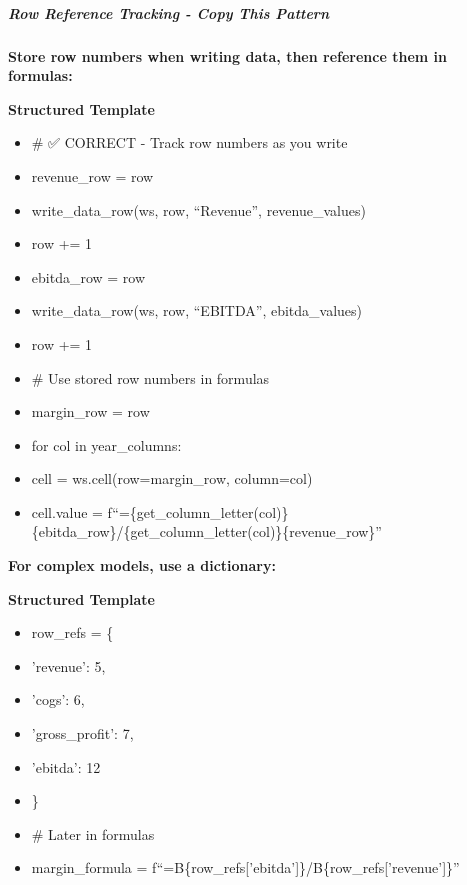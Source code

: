 \documentclass[11pt]{article}
\begin{document}
\subparagraph{Row Reference Tracking - Copy This Pattern}\mbox{}\par

\textbf{Store row numbers when writing data, then reference them in formulas:}


\textbf{Structured Template}
\begin{itemize}[leftmargin=*,itemsep=2pt,topsep=2pt]
\item {} \# ✅ CORRECT - Track row numbers as you write
\item {} revenue\_\allowbreak{}row = row
\item {} write\_\allowbreak{}data\_\allowbreak{}row(ws, row, ``Revenue'', revenue\_\allowbreak{}values)
\item {} row += 1
\item {} ebitda\_\allowbreak{}row = row
\item {} write\_\allowbreak{}data\_\allowbreak{}row(ws, row, ``EBITDA'', ebitda\_\allowbreak{}values)
\item {} row += 1
\item {} \# Use stored row numbers in formulas
\item {} margin\_\allowbreak{}row = row
\item {} for col in year\_\allowbreak{}columns:
\item {} cell = ws.cell(row=margin\_\allowbreak{}row, column=col)
\item {} cell.value = f``=\{get\_\allowbreak{}column\_\allowbreak{}letter(col)\}\{ebitda\_\allowbreak{}row\}/\{get\_\allowbreak{}column\_\allowbreak{}letter(col)\}\{revenue\_\allowbreak{}row\}''
\end{itemize}

\textbf{For complex models, use a dictionary:}


\textbf{Structured Template}
\begin{itemize}[leftmargin=*,itemsep=2pt,topsep=2pt]
\item {} row\_\allowbreak{}refs = \{
\item {} 'revenue': 5,
\item {} 'cogs': 6,
\item {} 'gross\_\allowbreak{}profit': 7,
\item {} 'ebitda': 12
\item {} \}
\item {} \# Later in formulas
\item {} margin\_\allowbreak{}formula = f``=B\{row\_\allowbreak{}refs['ebitda']\}/B\{row\_\allowbreak{}refs['revenue']\}''
\end{itemize}
\end{document}
